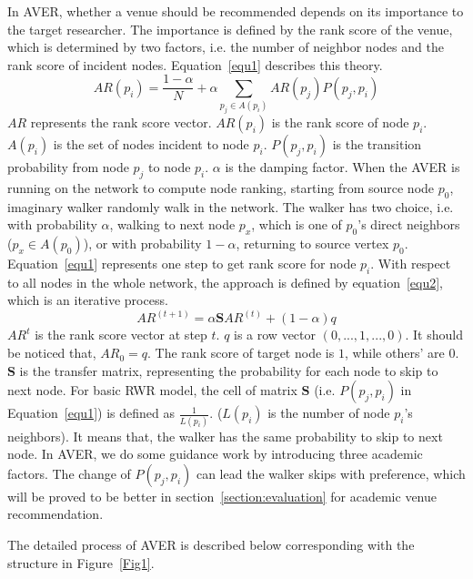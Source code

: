 \documentclass[9pt]{acm_proc_article-sp}
\begin{document}
In AVER, whether a venue should be recommended depends on its importance to the target researcher. The importance is defined by the rank score of the venue, which is determined by two factors, i.e. the number of neighbor nodes and the rank score of incident nodes. Equation~\ref{equ1} describes this theory.
\begin{equation}
\label{equ1}
AR(p_{i})=\frac{1-\alpha}{N}+\alpha \sum_{p_{j}\in A(p_{i})}AR(p_{j})P(p_{j},p_{i})
\end{equation}
$AR$ represents the rank score vector. $AR(p_{i})$ is the rank score of node $p_{i}$. $A(p_{i})$ is the set of nodes incident to node $p_{i}$. $P(p_{j},p_{i})$ is the transition probability from node $p_{j}$ to node $p_{i}$. $\alpha$ is the damping factor. When the AVER is running on the network to compute node ranking, starting from source node $p_{0}$, imaginary walker randomly walk in the network. The walker has two choice, i.e. with probability $\alpha$, walking to next node $p_{x}$, which is one of $p_{0}$'s direct neighbors ($p_{x}\in A(p_{0})$), or with probability $1-\alpha$, returning to source vertex $p_{0}$. Equation~\ref{equ1} represents one step to get rank score for node $p_{i}$. With respect to all nodes in the whole network, the approach is defined by equation~\ref{equ2}, which is an iterative process.
\begin{equation}
\label{equ2}
AR^{(t+1)}=\alpha \mathbf{S}AR^{(t)}+(1-\alpha)q
\end{equation}
$AR^{t}$ is the rank score vector at step $t$. $q$ is a row vector $(0,...,1,...,0)$. It should be noticed that, $AR_{0}=q$. The rank score of target node is $1$, while others' are $0$. $\mathbf{S}$ is the transfer matrix, representing the probability for each node to skip to next node. For basic RWR model, the cell of matrix $\mathbf{S}$ (i.e. $P(p_{j},p_{i})$ in Equation~\ref{equ1}) is defined as $\frac{1}{L(p_{i})}$. ($L(p_{i})$ is the number of node $p_{i}$'s neighbors). It means that, the walker has the same probability to skip to next node. In AVER, we do some guidance work by introducing three academic factors. The change of $P(p_{j},p_{i})$ can lead the walker skips with preference, which will be proved to be better in section~\ref{section:evaluation} for academic venue recommendation.

The detailed process of AVER is described below corresponding with the structure in Figure~\ref{Fig1}.
\end{document}
